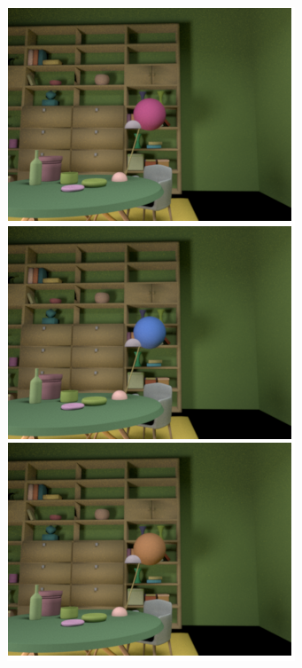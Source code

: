 \documentclass{jov}
\begin{document}
\begin{figure}
\centering
	\begin{subfigure}[b]{0.18 \textwidth}
    \centering
        \includegraphics[width=\textwidth]{../Figures/Figure5/Figure5_a.png}

\end{subfigure}
\end{figure}
\end{document}
